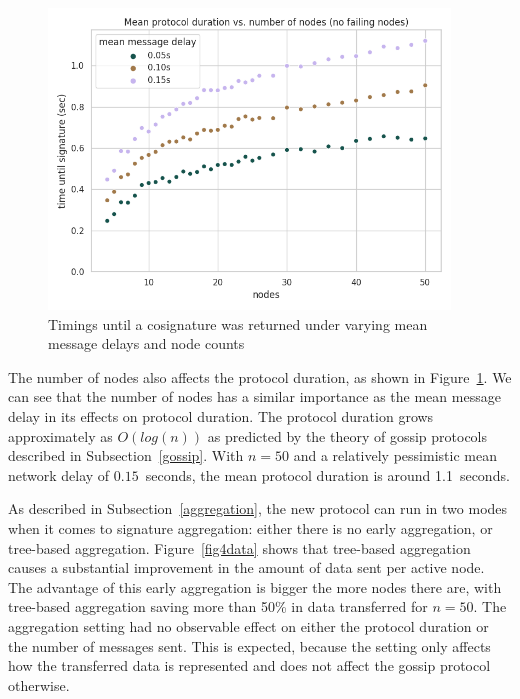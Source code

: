 \begin{figure}[!htbp]
    \centering
    \includegraphics[width=0.95\textwidth]{figures/5/round_wall_sum_by_num_nodes.png}
    \caption{Timings until a cosignature was returned under varying mean message delays and node counts}
    \label{fig5time}
\end{figure}

The number of nodes also affects the protocol duration, as shown in Figure~\ref{fig5time}.
We can see that the number of nodes has a similar importance as the mean message delay in its effects on protocol duration.
The protocol duration grows approximately as $O(log(n))$ as predicted by the theory of gossip protocols described in Subsection~\ref{gossip}.
With $n = 50$ and a relatively pessimistic mean network delay of $0.15$~seconds, the mean protocol duration is around 1.1~seconds.

As described in Subsection~\ref{aggregation}, the new protocol can run in two modes when it comes to signature aggregation: either there is no early aggregation, or tree-based aggregation.
Figure~\ref{fig4data} shows that tree-based aggregation causes a substantial improvement in the amount of data sent per active node.
The advantage of this early aggregation is bigger the more nodes there are, with tree-based aggregation saving more than 50\% in data transferred for $n = 50$.
The aggregation setting had no observable effect on either the protocol duration or the number of messages sent.
This is expected, because the setting only affects how the transferred data is represented and does not affect the gossip protocol otherwise.

